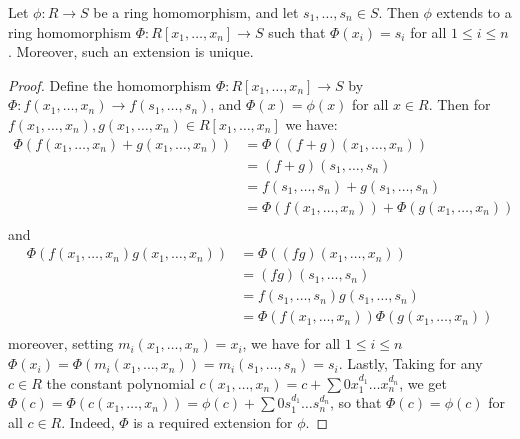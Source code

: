 \begin{theorem}\label{theorem_7.1.6}
  Let $\phi:R \xrightarrow{} S$ be a ring homomorphism, and let $s_1,
  \dots, s_n \in S$. Then $\phi$ extends to a ring homomorphism
  $\Phi:R[x_1, \dots, x_n] \xrightarrow{} S$ such that $\Phi(x_i)=s_i$
  for all $1 \leq i \leq n$. Moreover, such an extension is unique.
\end{theorem}
\begin{proof}
  Define the homomorphism $\Phi:R[x_1, \dots, x_n] \xrightarrow{} S$
  by $\Phi:f(x_1, \dots, x_n) \xrightarrow{} f(s_1, \dots, s_n)$, and
  $\Phi(x)=\phi(x)$ for all $x \in R$. Then for $f(x_1, \dots, x_n),
  g(x_1, \dots, x_n) \in R[x_1, \dots, x_n]$ we have:
  \begin{align*}
    \Phi(f(x_1, \dots, x_n)+g(x_1, \dots, x_n)) &= \Phi((f+g)(x_1, \dots, x_n)) \\
    &= (f+g)(s_1, \dots, s_n) \\
    &= f(s_1, \dots, s_n)+g(s_1, \dots, s_n) \\
    &= \Phi(f(x_1, \dots, x_n))+\Phi(g(x_1, \dots, x_n)) \\
  \end{align*}
  and
  \begin{align*}
    \Phi(f(x_1, \dots, x_n)g(x_1, \dots, x_n)) &= \Phi((fg)(x_1, \dots, x_n)) \\
    &= (fg)(s_1, \dots, s_n) \\
    &= f(s_1, \dots, s_n)g(s_1, \dots, s_n) \\
    &= \Phi(f(x_1, \dots, x_n))\Phi(g(x_1, \dots, x_n)) \\
  \end{align*}
  moreover, setting $m_i(x_1, \dots, x_n)=x_i$, we have for all $1
  \leq i \leq n$ $\Phi(x_i)=\Phi(m_i(x_1, \dots, x_n))=m_i(s_1, \dots,
  s_n)=s_i$. Lastly, Taking for any $c \in R$ the constant
  polynomial $c(x_1, \dots, x_n)=c+\sum{0x_1^{d_1} \dots x_n^{d_n}}$,
  we get $\Phi(c)=\Phi(c(x_1 ,\dots, x_n))=\phi(c)+\sum{0s_1^{d_1}
  \dots s_n^{d_n}}$, so that $\Phi(c)=\phi(c)$ for all $c \in R$.
  Indeed, $\Phi$ is a required extension for $\phi$.


\end{proof}
